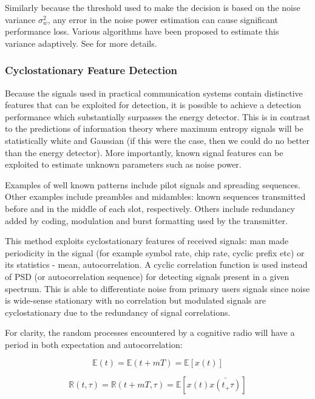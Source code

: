\documentclass[12pt, a4paper]{article}
\newcommand*\conj[1]{\bar{#1}}
\begin{document}
Similarly because the threshold used to make the decision is based on the noise variance \(\sigma_w^2\), any error in the noise power estimation can cause significant performance loss. Various algorithms have been proposed to estimate this variance adaptively. See \cite{Yucek2009} for more details.

\subsubsection{Cyclostationary Feature Detection}
Because the signals used in practical communication systems contain distinctive features that can be exploited for detection, it is possible to achieve a detection performance which substantially surpasses the energy detector. This is in contrast to the predictions of information theory where maximum entropy signals will be statistically white and Gaussian (if this were the case, then we could do no better than the energy detector). More importantly, known signal features can be exploited to estimate unknown parameters such as noise power. 

Examples of well known patterns include pilot signals and spreading sequences. Other examples include preambles and midambles: known sequences transmitted before and in the middle of each slot, respectively. Others include redundancy added by coding, modulation and burst formatting used by the transmitter. 

This method exploits cyclostationary features of received signals: man made periodicity in the signal (for example symbol rate, chip rate, cyclic prefix etc) or its statistics - mean, autocorrelation. A cyclic correlation function is used instead of PSD (or autocorrelation sequence) for detecting signals present in a given spectrum. This is able to differentiate noise from primary users signals since noise is wide-sense stationary with no correlation but modulated signals are cyclostationary due to the redundancy of signal correlations. 

For clarity, the random processes encountered by a cognitive radio will have a period in both expectation and autocorrelation:

\begin{equation}
\mathbb{E}\left(t\right) = \mathbb{E}\left(t + mT\right) = \mathbb{E}\left[x\left(t\right)\right]
\end{equation}

\begin{equation}
\mathbb{R}\left(t, \tau\right) = \mathbb{R}\left(t + mT, \tau\right) = \mathbb{E}\left[x\left(t\right)\conj{x\left(t_+\tau\right)}\right]
\end{equation}
\end{document}
